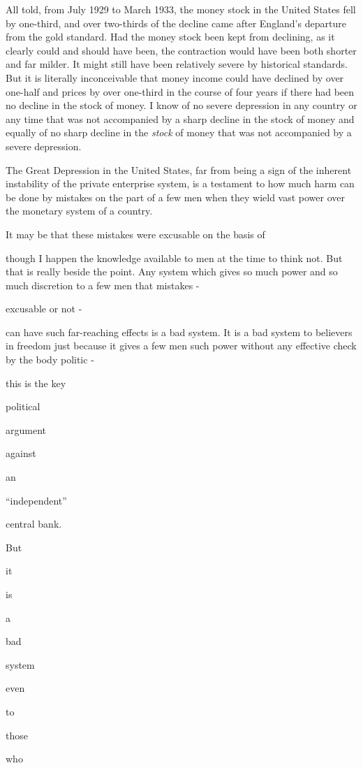 \documentclass[11pt,openany]{book}
\begin{document}
All told, from July 1929 to March 1933, the money stock in the United States fell by one-third, and over two-thirds of the decline came after England's departure from the gold standard. Had the money stock been kept from declining, as it clearly could and should have been, the contraction would have been both shorter and far milder. It might still have been relatively severe by historical standards. But it is literally inconceivable that money income could have declined by over one-half and prices by over one-third in the course of four years if there had been no decline in the stock of money. I know of no severe depression in any country or any time that was not accompanied by a sharp decline in the stock of money and equally of no sharp decline in the \emph{stock} of money that was not accompanied by a severe depression.

The Great Depression in the United States, far from being a sign of the inherent instability of the private enterprise system, is a testament to how much harm can be done by mistakes on the part of a few men when they wield vast power over the monetary system of a country.

It may be that these mistakes were excusable on the basis of

though I happen the knowledge available to men at the time to think not. But that is really beside the point. Any system which gives so much power and so much discretion to a few men that mistakes -

excusable or not -

can have such far-reaching effects is a bad system. It is a bad system to believers in freedom just because it gives a few men such power without any effective check by the body politic -

this is the key

political

argument

against

an

``independent''

central bank.

But

it

is

a

bad

system

even

to

those

who
\end{document}
